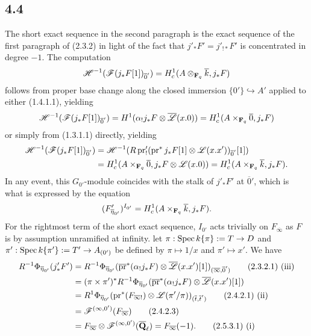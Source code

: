 \documentclass[deligne.tex]{subfiles}
\begin{document}
\subsection*{4.4}
The short exact sequence in the second paragraph is the exact sequence of
the first paragraph of (2.3.2) in light of the fact that $j'_*F'=j'_{!*}F'$
is concentrated in degree $-1$. The computation
\begin{equation*}
	\mathscr H^{-1}(\mathscr F(j_*F[1])_{\overline 0'})
	=H^1_c(A\otimes_{\mathbf{F}_q}\overline k,j_*F)
\end{equation*}
follows from proper base change along the closed immersion
$\{0'\}\hookrightarrow A'$ applied to either (1.4.1.1), yielding
\begin{equation*}
	\mathscr H^{-1}(\mathscr F(j_*F[1])_{\overline 0'})
	=H^1(\alpha_!j_*F\otimes\overline{\mathscr L}(x.0))
	=H^1_c(A\times_{\mathbf{F}_q}\overline0,j_*F)
\end{equation*}
or simply from (1.3.1.1) directly, yielding
\begin{align*}
	\mathscr H^{-1}(\mathscr F(j_*F[1])_{\overline 0'})
	&=\mathscr H^{-1}(R\operatorname{pr}_!'(\operatorname{pr}^*j_*F[1]\otimes\mathscr L(x.x'))_{\overline 0'}[1]) \\
	&=H^1_c(A\times_{\mathbf{F}_q}\overline0,j_*F\otimes\mathscr L(x.0))
	=H^1_c(A\times_{\mathbf{F}_q}\overline k,j_*F).
\end{align*}
In any event, this $G_{0'}$-module coincides with the stalk of $j'_*F'$ at
$\overline 0'$, which is what is expressed by the equation
\begin{equation*}
	(F'_{\overline\eta_{0'}})^{I_{0'}}
	=H^1_c(A\times_{\mathbf{F}_q}\overline k,j_*F).
\end{equation*}
For the rightmost term of the short exact sequence, $I_{0'}$ acts trivially
on $F_{\overline\infty}$ as $F$ is by assumption unramified at infinity.
let $\pi:\operatorname{Spec} k\{\pi\}:=T\rightarrow D$ and $\pi':\operatorname{Spec} k\{\pi'\}:=T'\rightarrow A_{(0')}$
be defined by $\pi\mapsto 1/x$ and $\pi'\mapsto x'$. We have
\begin{align*}
	R^{-1}\Phi_{\overline\eta_{0'}}(j_*'F')
	&=R^{-1}\Phi_{\overline\eta_{0'}}(\overline{\operatorname{pr}}^*(\alpha_!j_*F)
	\otimes\overline{\mathscr L}(x.x')[1])_{(\overline\infty,\overline0')}
	\tag{2.3.2.1) (iii} \\
	&=(\pi\times\pi')^*R^{-1}\Phi_{\overline\eta_{0'}}(\overline{\operatorname{pr}}^*(\alpha_!j_*F)\otimes\overline{\mathscr L}(x.x')[1]) \\
	&=R^1\Phi_{\overline \eta_{0'}}(\operatorname{pr}^*(F_{\overline\infty!})\otimes{\mathscr L}(\pi'/\pi))_{(\overline t,\overline t')}
	\tag{2.4.2.1) (ii} \\
	&=\mathscr F^{(\infty,0')}(F_{\overline\infty}) \tag{2.4.2.3} \\
	&=F_{\overline\infty}\otimes\mathscr F^{(\infty,0')}(\overline{\mathbf{Q}}_\ell)
	=F_{\overline\infty}(-1). \tag{2.5.3.1) (i}
\end{align*}
\end{document}
